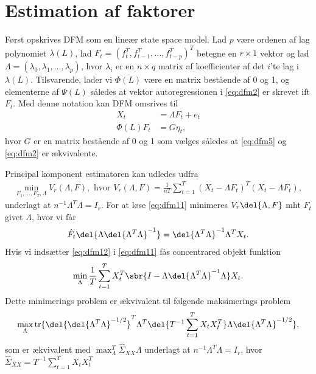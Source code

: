 \section{Estimation af faktorer}
Først opskrives DFM som en lineær state space model.
Lad $p$ være ordenen af lag polynomiet $\lambda(L)$, lad $F_t=(f_t^T,f_{t-1}^T,\ldots,f_{t-p}^T)^T$ betegne en $r \times 1$ vektor og lad $\Lambda=(\lambda_0,\lambda_1,\ldots,\lambda_p)$, hvor $\lambda_i$ er en $n \times q$ matrix af koefficienter af det $i$'te lag i $\lambda(L)$.
Tilsvarende, lader vi $\Phi(L)$ være en matrix bestående af 0 og 1, og elementerne af $\Psi(L)$ således at vektor autoregressionen i \eqref{eq:dfm2} er skrevet ift $F_t$.
Med denne notation kan DFM omsrives til
\begin{align}
X_t &= \Lambda F_t + e_t \label{eq:dfm4}\\
\Phi(L) F_t &= G \eta_t, \label{eq:dfm5}
\end{align}
hvor $G$ er en matrix bestående af 0 og 1 som vælges således at \eqref{eq:dfm5} og \eqref{eq:dfm2} er ækvivalente.

Principal komponent estimatoren kan udledes udfra 
\begin{align}
\min_{F_1,\ldots,F_T, \Lambda} V_r(\Lambda, F), \text{ hvor } V_r(\Lambda, F)=\frac{1}{nT} \sum_{t=1}^T(X_t-\Lambda F_t)^T(X_t - \Lambda F_t), \label{eq:dfm11}
\end{align}
underlagt at $n^{-1} \Lambda^T \Lambda = I_r$.
For at løse \eqref{eq:dfm11} minimeres $V_r\del{\Lambda,F}$ mht $F_t$ givet $\Lambda$, hvor vi får
\begin{align}
\hat{F}_t \del{\Lambda \del{\Lambda^T \Lambda}^{-1}}=\del{\Lambda^T \Lambda}^{-1} \Lambda^T X_t. \label{eq:dfm12}
\end{align}
Hvis vi indsætter \eqref{eq:dfm12} i \eqref{eq:dfm11} fås concentrared objekt funktion
\begin{align*}
\min_\Lambda \frac{1}{T} \sum_{t=1}^T X_t^T \sbr{I- \Lambda \del{\Lambda^T \Lambda}^{-1} \Lambda} X_t.
\end{align*}
Dette minimerings problem er ækvivalent til følgende maksimerings problem
\begin{align*}
\max_\Lambda \text{tr} \{\del{\del{\Lambda^T \Lambda}^{-1/2}}^T \Lambda^T \del{T^{-1} \sum_{t=1}^T X_t X_t^T} \Lambda \del{\Lambda^T \Lambda}^{-1/2}\},
\end{align*}
som er ækvivalent med $\max_\Lambda^T \hat{\Sigma}_{XX} \Lambda$ underlagt at $n^{-1} \Lambda^T \Lambda=I_r$, hvor $\hat{\Sigma}_{XX}=T^{-1} \sum_{t=1}^T X_t X_t^T$

